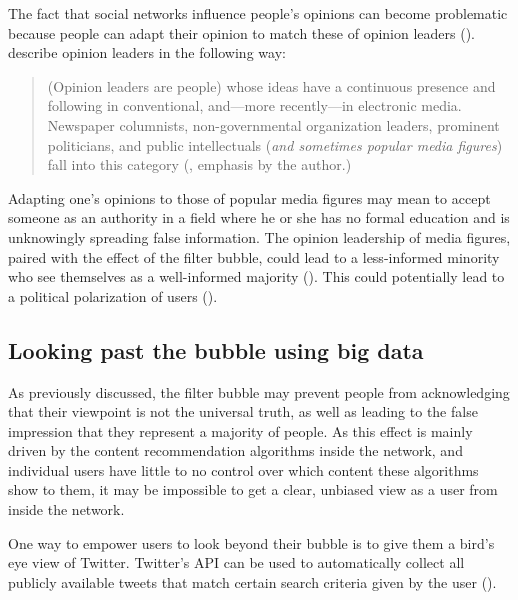 The fact that social networks influence people's opinions can become problematic because people can adapt their opinion to match these of opinion leaders (\cite{altafiniDynamicsOpinionForming2012}). \citeauthor{gokceTwitterPoliticsIdentifying2014} describe opinion leaders in the following way:

\begin{quote}
    (Opinion leaders are people) whose ideas have a continuous presence and following in conventional, and—more recently—in electronic media. Newspaper columnists, non-governmental organization leaders, prominent politicians, and public intellectuals (\emph{and sometimes popular media ﬁgures}) fall into this category (\cite[673]{gokceTwitterPoliticsIdentifying2014}, emphasis by the author.)
\end{quote}

Adapting one's opinions to those of popular media figures may mean to accept someone as an authority in a field where he or she has no formal education and is unknowingly spreading false information. The opinion leadership of media figures, paired with the effect of the filter bubble, could lead to a less-informed minority who see themselves as a well-informed majority (\cite{moscoviciSilentMajoritiesLoud1991}). This could potentially lead to a political polarization of users (\cite{kobayashiDepolarizationSocialMedia2020}).


\subsection{Looking past the bubble using big data}
As previously discussed, the filter bubble may prevent people from acknowledging that their viewpoint is not the universal truth, as well as leading to the false impression that they represent a majority of people. As this effect is mainly driven by the content recommendation algorithms inside the network, and individual users have little to no control over which content these algorithms show to them, it may be impossible to get a clear, unbiased view as a user from inside the network.

One way to empower users to look beyond their bubble is to give them a bird's eye view of Twitter. Twitter's API can be used to automatically collect all publicly available tweets that match certain search criteria given by the user (\cite{twitterinc.TwitterAPIs}).


